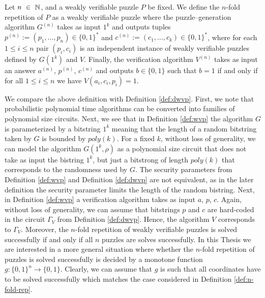 \documentclass[11pt,a4paper,titlepage]{memoir}
\begin{document}
%
\begin{definition}
  \label{def:n-fold-rep}
  Let $n~\in~\mathbb{N}$, and a weakly verifiable puzzle $P$ be fixed.
  We define the $n$-fold repetition of $P$ as a weakly verifiable puzzle where the puzzle--generation algorithm
  $G^{(n)}$ takes as input $1^k$ and outputs tuples $p^{(n)} := (p_1, \dotsc, p_n) \in \{0,1\}^{*}$ and $c^{(n)} := (c_1, \dotsc, c_k) \in \{0,1\}^{*}$,
  where for each $1 \leq i \leq n$ pair $(p_i, c_i)$ is an independent instance of weakly verifiable puzzles defined by $G(1^k)$ and $V$.
  Finally, the verification algorithm $V^{(n)}$ takes as input an answer $a^{(n)}$, $p^{(n)}$, $c^{(n)}$ and outputs $b \in \{0,1\}$
  such that $b = 1$ if and only if for all $1 \leq i \leq n$ we have $V(a_i, c_i, p_i) = 1$.
 \end{definition}
%
We compare the above definition with Definition \ref{def:dwvp}. First, we note that probabilistic polynomial time algorithms can be converted
into families of polynomial size circuits. Next, we see that in Definition \ref{def:wvp} the algorithm $G$ is parameterized by
a bitstring $1^k$ meaning that the length of a random bitstring taken by $G$ is bounded by $poly(k)$.
For a fixed $k$, without loss of generality, we can model the algorithm $G(1^k, \rho)$ as a polynomial size circuit
that does not take as input the bistring $1^k$, but just a bitstrong of length $\mathit{poly}(k)$ that  corresponds
to the randomness used by $G$. The security parameters from Definition \ref{def:wvp} and Definition \ref{def:dwvp} are not equivalent,
as in the later definition the security parameter limits the length of the random bistring.
Next, in Definition \ref{def:wvp} a verification algorithm takes as input $a$, $p$, $c$.
Again, without loss of generality, we can assume that bitstrings $p$ and $c$ are hard-coded in the circuit $\Gamma_V$ from Definition \ref{def:dwvp}.
Hence, the algorithm $V$ corresponds to $\Gamma_V$.
Moreover, the $n$-fold repetition of weakly verifiable puzzles is solved successfully if and only if all $n$ puzzles are solves successfully.
In this Thesis we are interested in a more general situation where whether the $n$-fold repetition of puzzles is solved successfully is decided by a monotone function
$g: \{0,1\}^{n} \rightarrow \{0,1\}$.
Clearly, we can assume that $g$ is such that all coordinates have to be solved successfully which matches the case considered in Definition \ref{def:n-fold-rep}.
\end{document}
